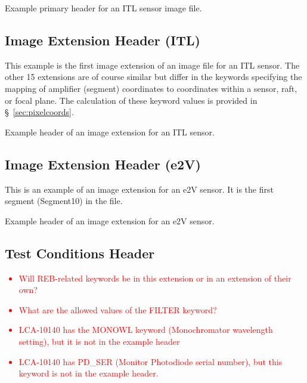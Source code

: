 \documentclass{article}[12pt]
\newcommand{\red}{\textcolor{red}}
\begin{document}
\begin{table}
\begin{alltt}

\end{alltt}
\caption{Example primary header for an ITL sensor image file.\label{tab:primary_ITL}}
\end{table}

\subsection{Image Extension Header (ITL)}
This example is the first image extension of an image file for an ITL sensor.  The other 15 extensions are of course similar but differ in the keywords specifying the mapping of amplifier (segment) coordinates to coordinates within a sensor, raft, or focal plane.  The calculation of these keyword values is provided in \S~\ref{sec:pixelcoords}.

\begin{table}
\tiny
\begin{alltt}

\end{alltt}
\caption{Example header of an image extension for an ITL sensor. \label{tab:image_ITL}}
\end{table}

\subsection{Image Extension Header (e2V)}

This is an example of an image extension for an e2V sensor.  It is the first segment (Segment10) in the file.

\begin{table}
\tiny
\begin{alltt}

\end{alltt}
\caption{Example header of an image extension for an e2V sensor.\label{tab:image_e2V}}
\end{table}

\subsection{Test Conditions Header}

\red{
\begin{itemize}
\item{Will REB-related keywords be in this extension or in an extension of their own?}
\item{What are the allowed values of the FILTER keyword?}
\item{LCA-10140 has the MONOWL keyword (Monochromator wavelength setting), but it is not in the example header}
\item{LCA-10140 has PD\_SER (Monitor Photodiode serial number), but this keyword is not in the example header.}
\end{itemize}
}
\end{document}
